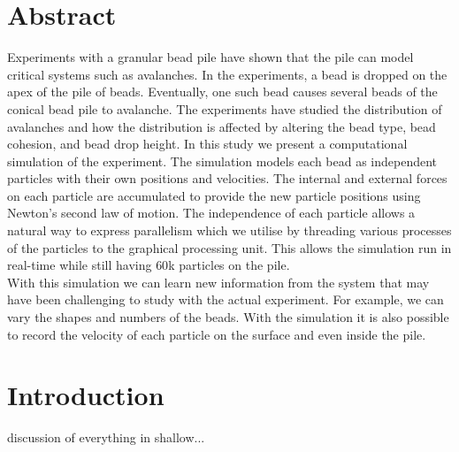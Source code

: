 \documentclass{book}
\begin{document}
\chapter*{Abstract}
\indent Experiments with a granular bead pile have shown that the pile can model critical systems such as avalanches. In the experiments, a bead is dropped on the apex of the pile of beads. Eventually, one such bead causes several beads of the conical bead pile to avalanche. The experiments have studied the distribution of avalanches and how the distribution is affected by altering the bead type, bead cohesion, and bead drop height. In this study we present a computational simulation of the experiment. The simulation models each bead as independent particles with their own positions and velocities. The internal and external forces on each particle are accumulated to provide the new particle positions using Newton's second law of motion. The independence of each particle allows a natural way to express parallelism which we utilise by threading various processes of the particles to the graphical processing unit. This allows the simulation run in real-time while still having $60$k particles on the pile.\\
\indent With this simulation we can learn new information from the system that may have been challenging to study with the actual experiment. For example, we can vary the shapes and numbers of the beads. With the simulation it is also possible to record the velocity of each particle on the surface and even inside the pile. 


\tableofcontents
\setcounter{tocdepth}{2}
\listoftables
\listoffigures

\mainmatter

\chapter{Introduction}\label{introduction}
discussion of everything in shallow... 
\end{document}
